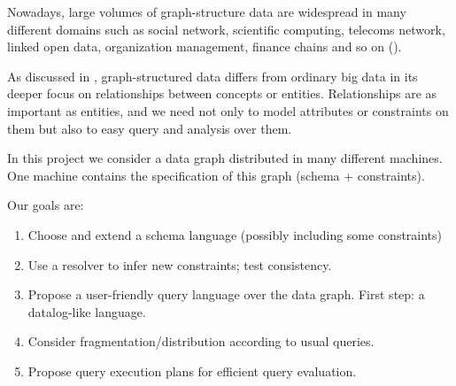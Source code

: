 

Nowadays, large volumes of graph-structure data are widespread  in many different domains such as social network, scientific computing, telecoms network, linked open data, organization management, finance chains and so on (\cite{Poul13}).

As discussed in \cite{Poul13}, graph-structured data differs from ordinary big data in its deeper focus on relationships between  concepts or entities.
 Relationships are as important as entities, and we need not only to  model attributes or constraints on them but also to easy query and analysis over them.
 
 In this project we consider a data graph distributed in many different machines.
 One machine contains the specification of this graph (schema + constraints).
 
 Our goals are:
 
 \begin{enumerate}
 \item Choose and extend a schema language (possibly including some constraints)
 \item Use a resolver to infer new constraints; test consistency.
 \item Propose a user-friendly query language over the data graph. First step:  a datalog-like language. 
 \item Consider fragmentation/distribution according to usual queries.
 \item Propose  query execution plans for efficient query evaluation.
 \end{enumerate}
